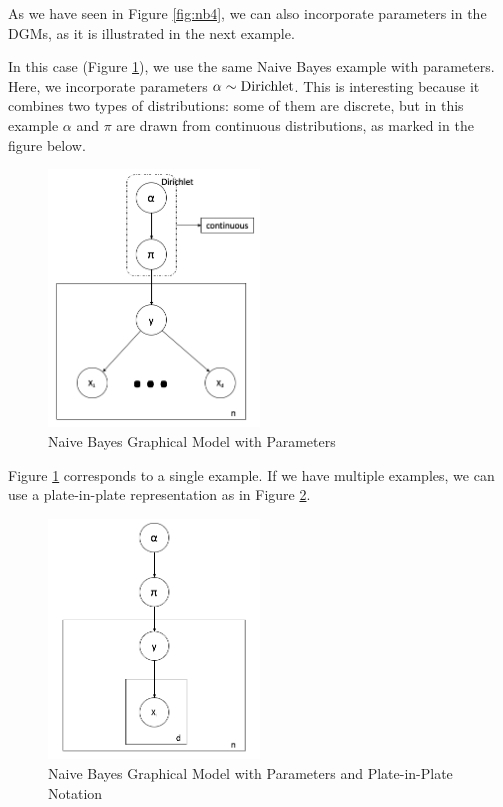 \documentclass{article}
\begin{document}
As we have seen in Figure \ref{fig:nb4}, we can also incorporate parameters in the DGMs, as it is illustrated in the next example.
\begin{example}
In this case (Figure \ref{fig:nb10}), we use the same Naive Bayes example with parameters. Here, we incorporate parameters $\alpha \sim \operatorname{Dirichlet}$. This is interesting because it combines two types of distributions: some of them are discrete, but in this example $\alpha$ and $\pi$ are drawn from continuous distributions, as marked in the figure below.
\begin{figure}[!ht]
    \centering
    \includegraphics[width = 0.5\textwidth]{nb10.png}
    \caption{Naive Bayes Graphical Model with Parameters}
    \label{fig:nb10}
\end{figure}
\end{example}
\FloatBarrier
Figure \ref{fig:nb10} corresponds to a single example. 
If we have multiple examples, we can use a plate-in-plate representation as in Figure \ref{fig:nb11}. 
\begin{figure}[!ht]
    \centering
    \includegraphics[width = 0.5\textwidth]{nb11.png}
    \caption{Naive Bayes Graphical Model with Parameters and Plate-in-Plate Notation}
    \label{fig:nb11}
\end{figure}
\end{document}
